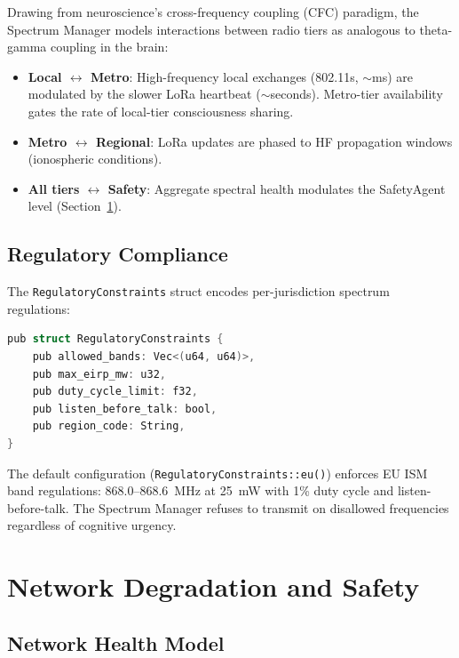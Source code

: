 \documentclass[11pt,twocolumn]{article}
\begin{document}
Drawing from neuroscience's cross-frequency coupling (CFC) paradigm,
the Spectrum Manager models interactions between radio tiers as
analogous to theta-gamma coupling in the brain:

\begin{itemize}[nosep]
  \item \textbf{Local $\leftrightarrow$ Metro}: High-frequency local
    exchanges (802.11s, $\sim$ms) are modulated by the slower LoRa
    heartbeat ($\sim$seconds). Metro-tier availability gates the rate
    of local-tier consciousness sharing.
  \item \textbf{Metro $\leftrightarrow$ Regional}: LoRa updates are
    phased to HF propagation windows (ionospheric conditions).
  \item \textbf{All tiers $\leftrightarrow$ Safety}: Aggregate spectral
    health modulates the SafetyAgent level (Section~\ref{sec:safety}).
\end{itemize}

\subsection{Regulatory Compliance}

The \texttt{RegulatoryConstraints} struct encodes per-jurisdiction
spectrum regulations:

\begin{lstlisting}[language=C,caption={Regulatory constraints}]
pub struct RegulatoryConstraints {
    pub allowed_bands: Vec<(u64, u64)>,
    pub max_eirp_mw: u32,
    pub duty_cycle_limit: f32,
    pub listen_before_talk: bool,
    pub region_code: String,
}
\end{lstlisting}

The default configuration (\texttt{RegulatoryConstraints::eu()}) enforces
EU ISM band regulations: 868.0--868.6~MHz at 25~mW with 1\% duty cycle
and listen-before-talk. The Spectrum Manager refuses to transmit on
disallowed frequencies regardless of cognitive urgency.

\section{Network Degradation and Safety}
\label{sec:safety}

\subsection{Network Health Model}
\end{document}
